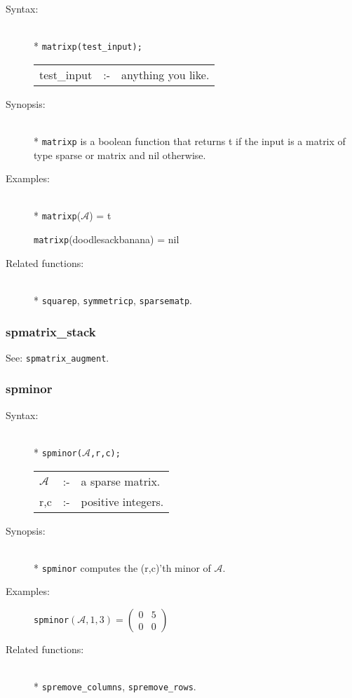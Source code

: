 \begin{description}
\item[Syntax:]\mbox{}\\*
\texttt{matrixp(test\_input);}\\[2mm]
\begin{tabular}{l l l}
test\_input &:-& anything you like.
\end{tabular}

\item[Synopsis:]\mbox{}\\*
\texttt{matrixp} is a boolean function that returns t if
                the input is a matrix of type sparse or matrix and nil otherwise.

\item[Examples:]\mbox{}\\*
\texttt{matrixp}($\mathcal{A}$) = t

\texttt{matrixp}(doodlesackbanana) = nil

\item[Related functions:]\mbox{}\\*
\texttt{squarep}, \texttt{symmetricp}, \texttt{sparsematp}.
\end{description}

\subsubsection{spmatrix\_stack}
\label{sparse:spmatrix_stack}
\hypertarget{operator:SPMATRIX_STACK}{}
See: \texttt{spmatrix\_augment}.


\subsubsection{spminor}
\label{sparse:spminor}
\hypertarget{operator:SPMINOR}{}

\begin{description}
\item[Syntax:]\mbox{}\\*
\texttt{spminor($\mathcal{A}$,r,c);}\\[2mm]
\begin{tabular}{l l l}
$\mathcal{A}$ &:-& a sparse matrix. \\
r,c        &:-& positive integers.
\end{tabular}

\item[Synopsis:]\mbox{}\\*
                \texttt{spminor} computes the (r,c)'th minor of $\mathcal{A}$.

\item[Examples:]
\texttt{spminor}\((\mathcal{A},1,3) =
        \begin{pmatrix} 0 & 5 \\ 0 & 0  \end{pmatrix}\)

\item[Related functions:]\mbox{}\\*
 \texttt{spremove\_columns}, \texttt{spremove\_rows}.
\end{description}

